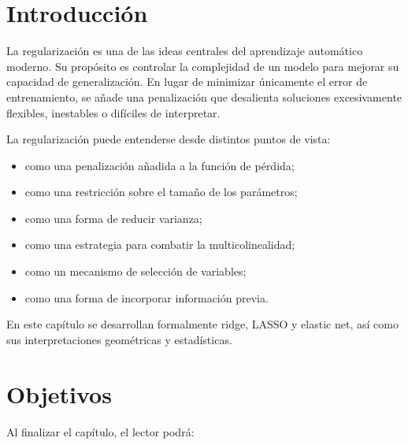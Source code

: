 \documentclass[
  spanish,
  11pt,
  letterpaper,
  DIV=11,
  numbers=noendperiod]{scrreprt}
\providecommand{\tightlist}{%
  \setlength{\itemsep}{0pt}\setlength{\parskip}{0pt}}
\theoremstyle{definition}
\theoremstyle{plain}
\theoremstyle{definition}
\theoremstyle{remark}
\begin{document}
\section{Introducción}\label{introducciuxf3n-8}

La regularización es una de las ideas centrales del aprendizaje
automático moderno. Su propósito es controlar la complejidad de un
modelo para mejorar su capacidad de generalización. En lugar de
minimizar únicamente el error de entrenamiento, se añade una
penalización que desalienta soluciones excesivamente flexibles,
inestables o difíciles de interpretar.

La regularización puede entenderse desde distintos puntos de vista:

\begin{itemize}
\tightlist
\item
  como una penalización añadida a la función de pérdida;
\item
  como una restricción sobre el tamaño de los parámetros;
\item
  como una forma de reducir varianza;
\item
  como una estrategia para combatir la multicolinealidad;
\item
  como un mecanismo de selección de variables;
\item
  como una forma de incorporar información previa.
\end{itemize}

En este capítulo se desarrollan formalmente ridge, LASSO y elastic net,
así como sus interpretaciones geométricas y estadísticas.

\section{Objetivos}\label{objetivos-7}

Al finalizar el capítulo, el lector podrá:
\end{document}
